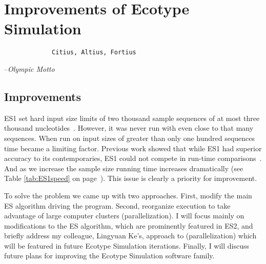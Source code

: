 \gobbletocpage
\chapter{Improvements of Ecotype Simulation}
\restoretocpage

\begin{shadequote}
\begin{center}
    \Large\begin{verbatim} 
             Citius, Altius, Fortius
 \end{verbatim}  
\end{center}
\par--\emph{Olympic Motto}
\end{shadequote}


\section{Improvements}
ES1 set hard input size limits of two thousand sample sequences of at most three thousand nucleotides~\cite{koeppel2008identifying}.
However, it was never run with even close to that many sequences.
When run on input sizes of greater than only one hundred sequences time became a limiting factor.
Previous work showed that while ES1 had superior  accuracy to its contemporaries, ES1 could not compete in run-time comparisons~\cite{carlo}.
And as we increase the sample size running time increases dramatically (see Table \ref{tab:ES1speed} on page~\pageref{tab:ES1speed}).
This issue is clearly a priority for improvement.

To solve the problem we came up with two approaches.
First, modify the main ES algorithm driving the program.
Second, reorganize execution to take advantage of large computer clusters (parallelization).
I will focus mainly on modifications to the ES algorithm, which are prominently featured in ES2, and briefly address my colleague, Lingyuan Ke's, approach to (parallelization) which will be featured in future Ecotype Simulation iterations.
Finally, I will discuss future plans for improving the Ecotype Simulation software family.


